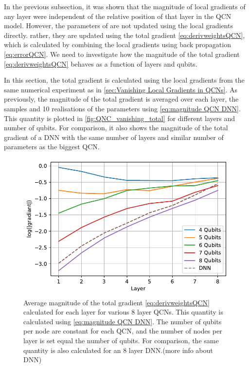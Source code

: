 
In the previous subsection, it was shown that the magnitude of local gradients of any layer were independent of the relative position of that layer in the QCN model. However, the parameters of are not updated using the local gradients directly. rather, they are updated using the total gradient \autoref{eq:derivweightsQCN}, which is calculated by combining the local gradients using back propagation \autoref{eq:errorQCN}. We need to investigate how the magnitude of the total gradient \autoref{eq:derivweightsQCN} behaves as a function of layers and qubits. 

In this section, the total gradient is calculated using the local gradients from the same numerical experiment as in \autoref{sec:Vanishing Local Gradients in QCNs}. As previously, the magnitude of the total gradient is averaged over each layer, the samples and 10 realisations of the parameters using \autoref{eq:magnitude QCN DNN}. This quantity is plotted in \autoref{fig:QNC_vanishing_total} for different layers and number of qubits. For comparison, it also shows the magnitude of the total gradient of a DNN with the same number of layers and similar number of parameters as the biggest QCN.

\begin{figure}[H]
    \centering
    \includegraphics[width=12cm]{latex/figures/vanishing_gradient_total.pdf}
    \caption{Average magnitude of the total gradient \autoref{eq:derivweightsQCN} calculated for each layer for various 8 layer QCNs. This quantity is calculated using \autoref{eq:magnitude QCN DNN}. The number of qubits per node are constant for each QCN, and the number of nodes per layer is set equal the number of qubits.  For comparison, the same quantity is also calculated for an 8 layer DNN.(more info about DNN)} 
    \label{fig:QNC_vanishing_total}
\end{figure}


